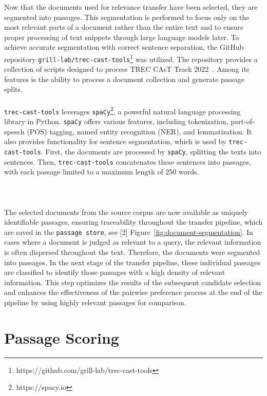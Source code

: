 Now that the documents used for relevance transfer have been selected, they are segmented into passages. This segmentation is performed to focus only on the most relevant parts of a document rather than the entire text and to ensure proper processing of text snippets through large language models later. To achieve accurate segmentation with correct sentence separation, the GitHub repository \texttt{grill-lab/trec-cast-tools}\footnote{https://github.com/grill-lab/trec-cast-tools} was utilized. The repository provides a collection of scripts designed to process TREC CAsT Track 2022~\citep{owoicho:2022}. Among its features is the ability to process a document collection and generate passage splits.
\\\\
\texttt{trec-cast-tools} leverages \texttt{spaCy}\footnote{https://spacy.io}, a powerful natural language processing library in Python. \texttt{spaCy} offers various features, including tokenization, part-of-speech (POS) tagging, named entity recognition (NER), and lemmatization. It also provides functionality for sentence segmentation, which is used by \texttt{trec-cast-tools}. First, the documents are processed by \texttt{spaCy}, splitting the texts into sentences. Then, \texttt{trec-cast-tools} concatenates these sentences into passages, with each passage limited to a maximum length of 250 words.
\\\\\\\\
The selected documents from the source corpus are now available as uniquely identifiable passages, ensuring traceability throughout the transfer pipeline, which are saved in the \texttt{passage store}, see [2] Figure~\ref{fig:document-segmentation}. In cases where a document is judged as relevant to a query, the relevant information is often dispersed throughout the text. Therefore, the documents were segmented into passages. In the next stage of the transfer pipeline, these individual passages are classified to identify those passages with a high density of relevant information. This step optimizes the results of the subsequent candidate selection and enhances the effectiveness of the pairwise preference process at the end of the pipeline by using highly relevant passages for comparison.
\pagebreak


\section{Passage Scoring}\label{passage-scoring}

